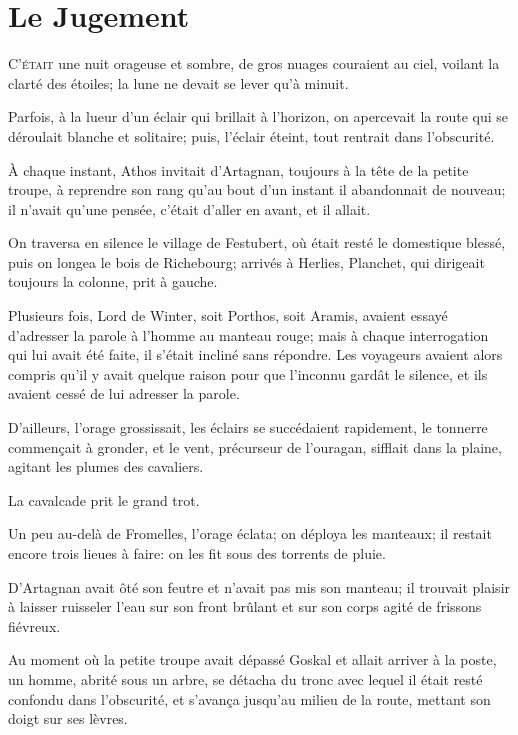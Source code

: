 
\chapter{Le Jugement} 
	
\lettrine{C}{'était} une nuit orageuse et sombre, de gros nuages couraient au ciel, voilant la clarté des étoiles; la lune ne devait se lever qu'à minuit. 

Parfois, à la lueur d'un éclair qui brillait à l'horizon, on apercevait la route qui se déroulait blanche et solitaire; puis, l'éclair éteint, tout rentrait dans l'obscurité. 

À chaque instant, Athos invitait d'Artagnan, toujours à la tête de la petite troupe, à reprendre son rang qu'au bout d'un instant il abandonnait de nouveau; il n'avait qu'une pensée, c'était d'aller en avant, et il allait. 

On traversa en silence le village de Festubert, où était resté le domestique blessé, puis on longea le bois de Richebourg; arrivés à Herlies, Planchet, qui dirigeait toujours la colonne, prit à gauche. 

Plusieurs fois, Lord de Winter, soit Porthos, soit Aramis, avaient essayé d'adresser la parole à l'homme au manteau rouge; mais à chaque interrogation qui lui avait été faite, il s'était incliné sans répondre. Les voyageurs avaient alors compris qu'il y avait quelque raison pour que l'inconnu gardât le silence, et ils avaient cessé de lui adresser la parole. 

D'ailleurs, l'orage grossissait, les éclairs se succédaient rapidement, le tonnerre commençait à gronder, et le vent, précurseur de l'ouragan, sifflait dans la plaine, agitant les plumes des cavaliers. 

La cavalcade prit le grand trot. 

Un peu au-delà de Fromelles, l'orage éclata; on déploya les manteaux; il restait encore trois lieues à faire: on les fit sous des torrents de pluie. 

D'Artagnan avait ôté son feutre et n'avait pas mis son manteau; il trouvait plaisir à laisser ruisseler l'eau sur son front brûlant et sur son corps agité de frissons fiévreux. 

Au moment où la petite troupe avait dépassé Goskal et allait arriver à la poste, un homme, abrité sous un arbre, se détacha du tronc avec lequel il était resté confondu dans l'obscurité, et s'avança jusqu'au milieu de la route, mettant son doigt sur ses lèvres. 

